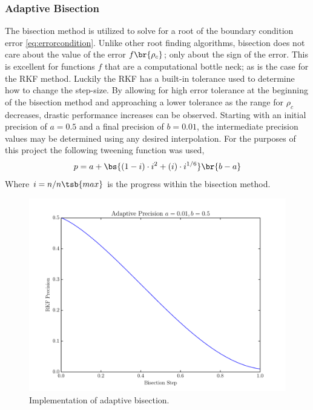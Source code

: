 \documentclass[11pt]{article}
\begin{document}
    \subsubsection{Adaptive Bisection}
    The bisection method is utilized to solve for a root of the boundary condition error \eqref{eq:errorcondition}. Unlike other root finding algorithms, bisection does not care about the value of the error $f\br{\rho_c}$; only about the sign of the error. This is excellent for functions $f$ that are a computational bottle neck; as is the case for the RKF method. Luckily the RKF has a built-in tolerance used to determine how to change the step-size. By allowing for high error tolerance at the beginning of the bisection method and approaching a lower tolerance as the range for $\rho_c$ decreases, drastic performance increases can be observed. Starting with an initial precision of $a=0.5$ and a final precision of $b=0.01$, the intermediate precision values may be determined using any desired interpolation. For the purposes of this project the following tweening function was used,
    \[ p = a + \bs{(1-i)\cdot i^2 + (i)\cdot i^{1/6}} \br{b-a}\]
    Where $i = n/n\tsb{max}$ is the progress within the bisection method.
    \begin{center}
    \begin{figure}[H]
        \includegraphics[width=6in]{figures/bisection_tween.pdf}
        \caption{Implementation of adaptive bisection.}
        \label{fig:adaptivebisection}
    \end{figure}
    \end{center}
\end{document}
